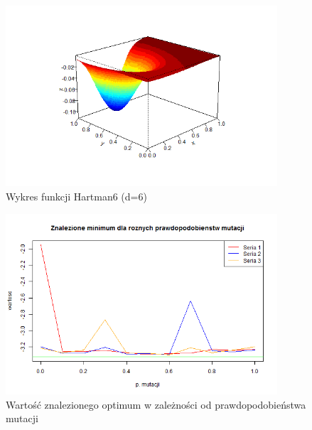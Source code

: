 \documentclass[11pt, a4paper]{article}
\begin{document}
\begin{figure}[H]
	\begin{center}
		\includegraphics[width=0.9\textwidth]{./assets/Hartman61.png} %
		\caption{Wykres funkcji Hartman6 (d=6)}
		\label{fig:hartman61}
	\end{center}
\end{figure}

\begin{figure}[H]
	\begin{center}
		\includegraphics[width=0.9\textwidth]{./assets/Hartman62.png} %
		\caption{Wartość znalezionego optimum w zależności od prawdopodobieństwa mutacji}
		\label{fig:hartman62}
	\end{center}
\end{figure}
\end{document}
